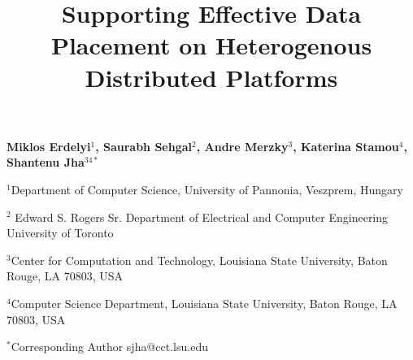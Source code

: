 \documentclass[a4paper,11pt]{article}
\begin{document}
\begin{center}
\title {\Large \bf Supporting Effective Data Placement on Heterogenous Distributed Platforms}

\textbf {\normalsize \hspace{0.6 in} Miklos Erdelyi$^1$, Saurabh Sehgal$^2$, Andre Merzky$^3$,  \newline Katerina Stamou$^4$, Shantenu Jha$^{34*}$ }

\normalsize { \hspace{0.6 in} $^1$Department of Computer Science, University of Pannonia, Veszprem, Hungary}

\normalsize { \hspace{0.6 in} $^2$ Edward S. Rogers Sr. Department of Electrical and Computer Engineering  University of Toronto}

\normalsize { \hspace{0.6 in} $^3$Center for Computation and Technology, \newline Louisiana State University, Baton Rouge, LA 70803, USA}

\normalsize {\hspace{0.6 in} $^4$Computer Science Department, \newline Louisiana State University, Baton Rouge, LA 70803, USA}

{\footnotesize {\hspace{0.0 in} $^*$Corresponding Author sjha@cct.lsu.edu}}

\end{center}

\end{document}
